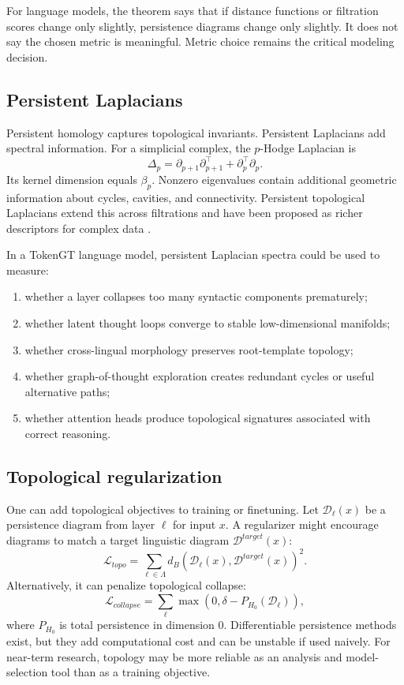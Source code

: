 \documentclass[11pt]{article}
\newcommand{\1}{\mathbf{1}}
\begin{document}
For language models, the theorem says that if distance functions or filtration scores change only slightly, persistence diagrams change only slightly. It does not say the chosen metric is meaningful. Metric choice remains the critical modeling decision.

\subsection{Persistent Laplacians}

Persistent homology captures topological invariants. Persistent Laplacians add spectral information. For a simplicial complex, the $p$-Hodge Laplacian is
\[
\Delta_p=\partial_{p+1}\partial_{p+1}^\top+\partial_p^\top\partial_p.
\]
Its kernel dimension equals $\beta_p$. Nonzero eigenvalues contain additional geometric information about cycles, cavities, and connectivity. Persistent topological Laplacians extend this across filtrations and have been proposed as richer descriptors for complex data \cite{WeiPersistentLaplacian2023}.

In a TokenGT language model, persistent Laplacian spectra could be used to measure:
\begin{enumerate}
\item whether a layer collapses too many syntactic components prematurely;
\item whether latent thought loops converge to stable low-dimensional manifolds;
\item whether cross-lingual morphology preserves root-template topology;
\item whether graph-of-thought exploration creates redundant cycles or useful alternative paths;
\item whether attention heads produce topological signatures associated with correct reasoning.
\end{enumerate}

\subsection{Topological regularization}

One can add topological objectives to training or finetuning. Let $\mathcal{D}_\ell(x)$ be a persistence diagram from layer $\ell$ for input $x$. A regularizer might encourage diagrams to match a target linguistic diagram $\mathcal{D}^{target}(x)$:
\[
\mathcal{L}_{topo}=\sum_{\ell\in\Lambda} d_B(\mathcal{D}_\ell(x),\mathcal{D}^{target}(x))^2.
\]
Alternatively, it can penalize topological collapse:
\[
\mathcal{L}_{collapse}=\sum_\ell \max(0,\delta-P_{H_0}(\mathcal{D}_\ell)),
\]
where $P_{H_0}$ is total persistence in dimension $0$. Differentiable persistence methods exist, but they add computational cost and can be unstable if used naively. For near-term research, topology may be more reliable as an analysis and model-selection tool than as a training objective.
\end{document}
